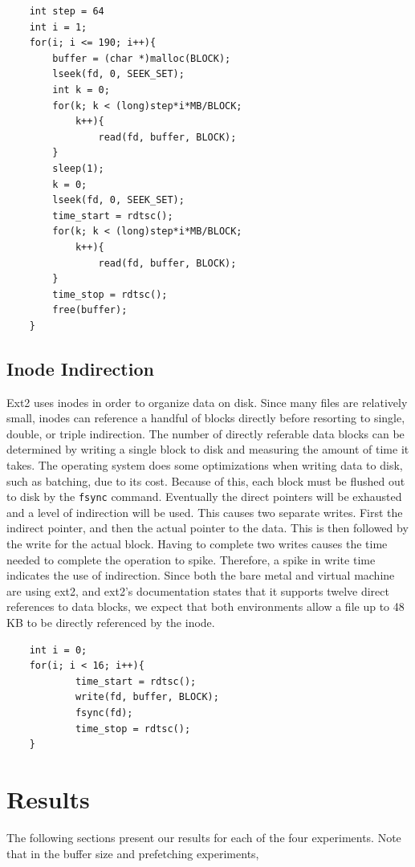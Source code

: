 \documentclass[letterpaper,twocolumn,10pt]{article}
\begin{document}
\begin{verbatim}
    int step = 64
    int i = 1;
    for(i; i <= 190; i++){
        buffer = (char *)malloc(BLOCK);
        lseek(fd, 0, SEEK_SET);
        int k = 0;
        for(k; k < (long)step*i*MB/BLOCK; 
            k++){
                read(fd, buffer, BLOCK);
        }
        sleep(1);
        k = 0;
        lseek(fd, 0, SEEK_SET);
        time_start = rdtsc();
        for(k; k < (long)step*i*MB/BLOCK; 
            k++){
                read(fd, buffer, BLOCK);
        }
        time_stop = rdtsc();
        free(buffer);
    }
\end{verbatim}

\subsection{Inode Indirection}
Ext2 uses inodes in order to organize data on disk. 
Since many files are relatively small, inodes can reference a handful of blocks directly before resorting to single, double, or triple indirection.
The number of directly referable data blocks can be determined by writing a single block to disk and measuring the amount of time it takes. 
The operating system does some optimizations when writing data to disk, such as batching, due to its cost. 
Because of this, each block must be flushed out to disk by the \texttt{fsync} command.
Eventually the direct pointers will be exhausted and a level of indirection will be used. 
This causes two separate writes. 
First the indirect pointer, and then the actual pointer to the data. 
This is then followed by the write for the actual block. 
Having to complete two writes causes the time needed to complete the operation to spike. 
Therefore, a spike in write time indicates the use of indirection.
Since both the bare metal and virtual machine are using ext2, and ext2's documentation states that it supports twelve direct references to data blocks, we expect that both environments allow a file up to 48 KB to be directly referenced by the inode.

\begin{verbatim}
    int i = 0;
    for(i; i < 16; i++){
            time_start = rdtsc();
            write(fd, buffer, BLOCK);
            fsync(fd);
            time_stop = rdtsc();
    }
\end{verbatim}

\section{Results}
The following sections present our results for each of the four experiments. Note that in the buffer size and prefetching experiments, 
\end{document}
